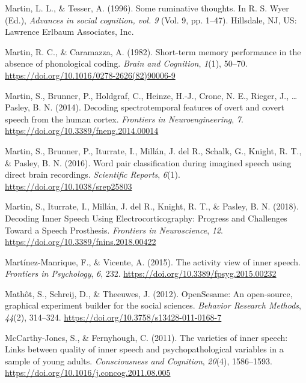 \documentclass[a4paper,12pt,twoside,openright,oldfontcommands,final]{memoir}
\begin{document}
\leavevmode\hypertarget{ref-Martin}{}%
Martin, L. L., \& Tesser, A. (1996). Some ruminative thoughts. In R. S. Wyer (Ed.), \emph{Advances in social cognition, vol. 9} (Vol. 9, pp. 1--47). Hillsdale, NJ, US: Lawrence Erlbaum Associates, Inc.

\leavevmode\hypertarget{ref-martin_short-term_1982}{}%
Martin, R. C., \& Caramazza, A. (1982). Short-term memory performance in the absence of phonological coding. \emph{Brain and Cognition}, \emph{1}(1), 50--70. \url{https://doi.org/10.1016/0278-2626(82)90006-9}

\leavevmode\hypertarget{ref-martin_decoding_2014}{}%
Martin, S., Brunner, P., Holdgraf, C., Heinze, H.-J., Crone, N. E., Rieger, J., \ldots{} Pasley, B. N. (2014). Decoding spectrotemporal features of overt and covert speech from the human cortex. \emph{Frontiers in Neuroengineering}, \emph{7}. \url{https://doi.org/10.3389/fneng.2014.00014}

\leavevmode\hypertarget{ref-martin_word_2016}{}%
Martin, S., Brunner, P., Iturrate, I., Millán, J. del R., Schalk, G., Knight, R. T., \& Pasley, B. N. (2016). Word pair classification during imagined speech using direct brain recordings. \emph{Scientific Reports}, \emph{6}(1). \url{https://doi.org/10.1038/srep25803}

\leavevmode\hypertarget{ref-martin_decoding_2018}{}%
Martin, S., Iturrate, I., Millán, J. del R., Knight, R. T., \& Pasley, B. N. (2018). Decoding Inner Speech Using Electrocorticography: Progress and Challenges Toward a Speech Prosthesis. \emph{Frontiers in Neuroscience}, \emph{12}. \url{https://doi.org/10.3389/fnins.2018.00422}

\leavevmode\hypertarget{ref-Martinez-Manrique2015}{}%
Martínez-Manrique, F., \& Vicente, A. (2015). The activity view of inner speech. \emph{Frontiers in Psychology}, \emph{6}, 232. \url{https://doi.org/10.3389/fpsyg.2015.00232}

\leavevmode\hypertarget{ref-mathot_opensesame_2012}{}%
Mathôt, S., Schreij, D., \& Theeuwes, J. (2012). OpenSesame: An open-source, graphical experiment builder for the social sciences. \emph{Behavior Research Methods}, \emph{44}(2), 314--324. \url{https://doi.org/10.3758/s13428-011-0168-7}

\leavevmode\hypertarget{ref-McCarthy-Jones2011}{}%
McCarthy-Jones, S., \& Fernyhough, C. (2011). The varieties of inner speech: Links between quality of inner speech and psychopathological variables in a sample of young adults. \emph{Consciousness and Cognition}, \emph{20}(4), 1586--1593. \url{https://doi.org/10.1016/j.concog.2011.08.005}
\end{document}
